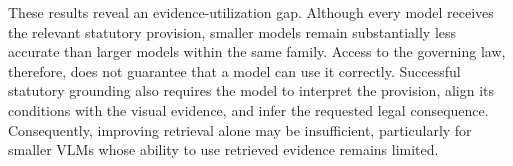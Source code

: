 These results reveal an evidence-utilization gap. Although every model receives the relevant statutory provision, smaller models remain substantially less accurate than larger models within the same family. Access to the governing law, therefore, does not guarantee that a model can use it correctly. Successful statutory grounding also requires the model to interpret the provision, align its conditions with the visual evidence, and infer the requested legal consequence. Consequently, improving retrieval alone may be insufficient, particularly for smaller VLMs whose ability to use retrieved evidence remains limited.